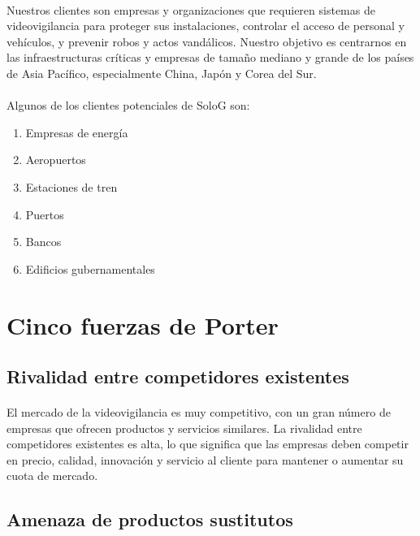 \documentclass{report}
\begin{document}
        \paragraph*{}{
          Nuestros clientes son empresas y organizaciones que requieren sistemas de videovigilancia para proteger sus instalaciones, controlar el acceso de personal y vehículos, y prevenir robos y actos vandálicos.
          Nuestro objetivo es centrarnos en las infraestructuras críticas y empresas de tamaño mediano y grande de los países de Asia Pacífico, especialmente China, Japón y Corea del Sur.
        }
        \paragraph*{}
        {
          Algunos de los clientes potenciales de SoloG son:
        }
        \begin{multicols}{2}
          \begin{enumerate}
            \item Empresas de energía
            \item Aeropuertos
            \item Estaciones de tren
            \item Puertos
            \item Bancos
            \item Edificios gubernamentales
          \end{enumerate}
        \end{multicols}
      \clearpage\section{Cinco fuerzas de Porter}
        \subsection*{Rivalidad entre competidores existentes}
          \paragraph*{}{El mercado de la videovigilancia es muy competitivo, con un gran número de empresas que ofrecen productos y servicios similares. La rivalidad entre competidores existentes es alta, lo que significa que las empresas deben competir en precio, calidad, innovación y servicio al cliente para mantener o aumentar su cuota de mercado.}
        \subsection*{Amenaza de productos sustitutos}
\end{document}
